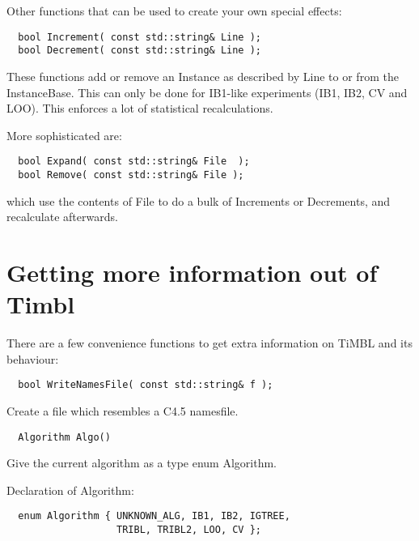Other functions that can be used to create your own special effects:

\begin{footnotesize}
\begin{verbatim}
  bool Increment( const std::string& Line ); 
  bool Decrement( const std::string& Line ); 
\end{verbatim}
\end{footnotesize}

These functions add or remove an Instance as described by Line to or
from the InstanceBase.
This can only be done for IB1-like experiments (IB1, IB2, CV and LOO).
This enforces a lot of statistical recalculations.

More sophisticated are:
\begin{footnotesize}
\begin{verbatim}
  bool Expand( const std::string& File  );
  bool Remove( const std::string& File );
\end{verbatim}
\end{footnotesize}

which use the contents of File to do a bulk of Increments or Decrements, and
recalculate afterwards.

\section{Getting more information out of Timbl}

There are a few convenience functions to get extra information on
TiMBL and its behaviour:

\begin{footnotesize}
\begin{verbatim}
  bool WriteNamesFile( const std::string& f );
\end{verbatim}
\end{footnotesize}

Create a file which resembles a C4.5 namesfile.

\begin{footnotesize}
\begin{verbatim}
  Algorithm Algo()
\end{verbatim}
\end{footnotesize}

Give the current algorithm as a type enum Algorithm.

Declaration of Algorithm:
\begin{footnotesize}
\begin{verbatim}
  enum Algorithm { UNKNOWN_ALG, IB1, IB2, IGTREE, 
                   TRIBL, TRIBL2, LOO, CV };
\end{verbatim}
\end{footnotesize}

